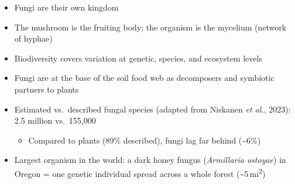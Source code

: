 \begin{itemize}
  \item Fungi are their own kingdom
  \item The mushroom is the fruiting body; the organism is the mycelium (network of hyphae)
\end{itemize}

\begin{imagerow}
   \hfill
\end{imagerow}

\begin{itemize}
  \item Biodiversity covers variation at genetic, species, and ecosystem levels
  \item Fungi are at the base of the soil food web as decomposers and symbiotic partners to plants
\end{itemize}

\begin{imagerow}
   \hfill
\end{imagerow}

\begin{itemize}
  \item Estimated vs.\ described fungal species (adapted from Niskanen \textit{et al.}, 2023): 2.5 million vs.\ 155,000
  \begin{itemize}
    \item Compared to plants (89\% described), fungi lag far behind (\textasciitilde6\%)
  \end{itemize}
  \item Largest organism in the world: a dark honey fungus (\textit{Armillaria ostoyae}) in Oregon = one genetic individual spread across a whole forest (\textasciitilde5\,mi\textsuperscript{2})
\end{itemize}

\begin{imagerow}
   \hfill
\end{imagerow}



